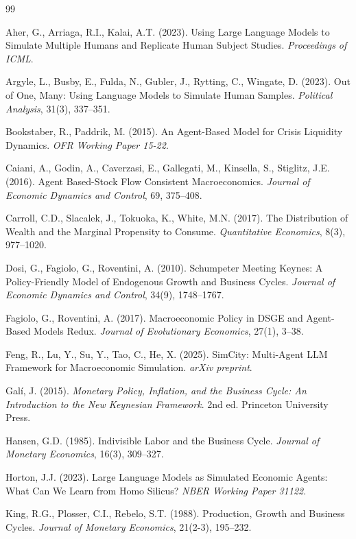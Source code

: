 \documentclass[12pt, a4paper]{article}
\begin{document}
\begin{thebibliography}{99}

Aher, G., Arriaga, R.I., Kalai, A.T. (2023).
Using Large Language Models to Simulate Multiple Humans and Replicate Human Subject Studies.
\textit{Proceedings of ICML}.

Argyle, L., Busby, E., Fulda, N., Gubler, J., Rytting, C., Wingate, D. (2023).
Out of One, Many: Using Language Models to Simulate Human Samples.
\textit{Political Analysis}, 31(3), 337--351.


Bookstaber, R., Paddrik, M. (2015).
An Agent-Based Model for Crisis Liquidity Dynamics.
\textit{OFR Working Paper 15-22}.

Caiani, A., Godin, A., Caverzasi, E., Gallegati, M., Kinsella, S., Stiglitz, J.E. (2016).
Agent Based-Stock Flow Consistent Macroeconomics.
\textit{Journal of Economic Dynamics and Control}, 69, 375--408.

Carroll, C.D., Slacalek, J., Tokuoka, K., White, M.N. (2017).
The Distribution of Wealth and the Marginal Propensity to Consume.
\textit{Quantitative Economics}, 8(3), 977--1020.

Dosi, G., Fagiolo, G., Roventini, A. (2010).
Schumpeter Meeting Keynes: A Policy-Friendly Model of Endogenous Growth and Business Cycles.
\textit{Journal of Economic Dynamics and Control}, 34(9), 1748--1767.

Fagiolo, G., Roventini, A. (2017).
Macroeconomic Policy in DSGE and Agent-Based Models Redux.
\textit{Journal of Evolutionary Economics}, 27(1), 3--38.

Feng, R., Lu, Y., Su, Y., Tao, C., He, X. (2025).
SimCity: Multi-Agent LLM Framework for Macroeconomic Simulation.
\textit{arXiv preprint}.

Galí, J. (2015).
\textit{Monetary Policy, Inflation, and the Business Cycle: An Introduction to the New Keynesian Framework}.
2nd ed. Princeton University Press.

Hansen, G.D. (1985).
Indivisible Labor and the Business Cycle.
\textit{Journal of Monetary Economics}, 16(3), 309--327.

Horton, J.J. (2023).
Large Language Models as Simulated Economic Agents: What Can We Learn from Homo Silicus?
\textit{NBER Working Paper 31122}.


King, R.G., Plosser, C.I., Rebelo, S.T. (1988).
Production, Growth and Business Cycles.
\textit{Journal of Monetary Economics}, 21(2-3), 195--232.


\end{thebibliography}
\end{document}
